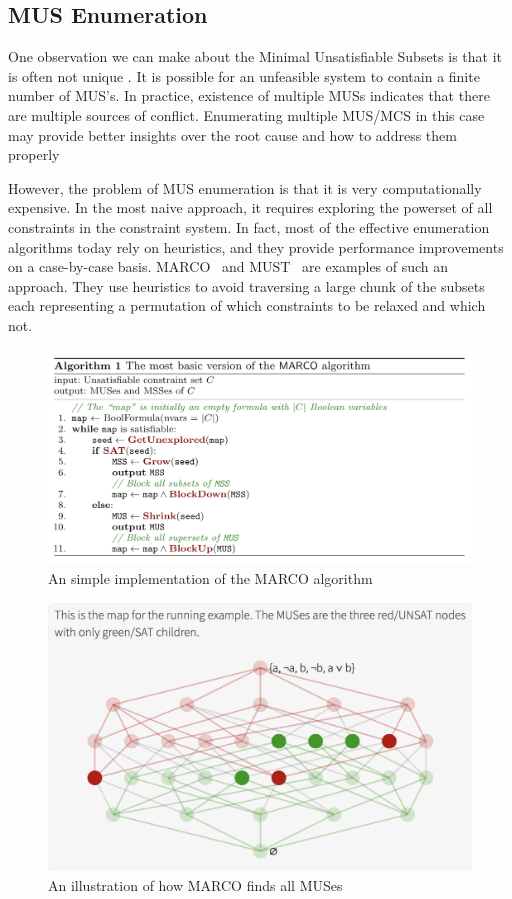 \subsection{MUS Enumeration}
One observation we can make about the  Minimal Unsatisfiable Subsets is that it is often not unique . It is possible for an unfeasible system to contain a finite number of MUS’s. In practice, existence of multiple MUSs indicates that there are multiple sources of conflict. Enumerating multiple MUS/MCS in this case may provide better insights over the root cause and how to address them properly


However, the problem of MUS enumeration is that it is very computationally expensive. In the most naive approach, it requires exploring the powerset of all constraints in the constraint system. In fact, most of the effective enumeration algorithms today rely on heuristics, and they provide performance improvements on a case-by-case basis. MARCO~\cite{} and MUST~\cite{} are examples of such an approach. They use heuristics to avoid traversing a large chunk of the subsets each representing a permutation of which constraints to be relaxed and which not.


\begin{figure}
  \includegraphics[width=\linewidth]{MarcoAlgo}
  \caption{An simple implementation of the MARCO algorithm}
\end{figure}


\begin{figure}
  \includegraphics[width=\linewidth]{MarcoViz}
  \caption{An illustration of how MARCO finds all MUSes}
\end{figure}
  

